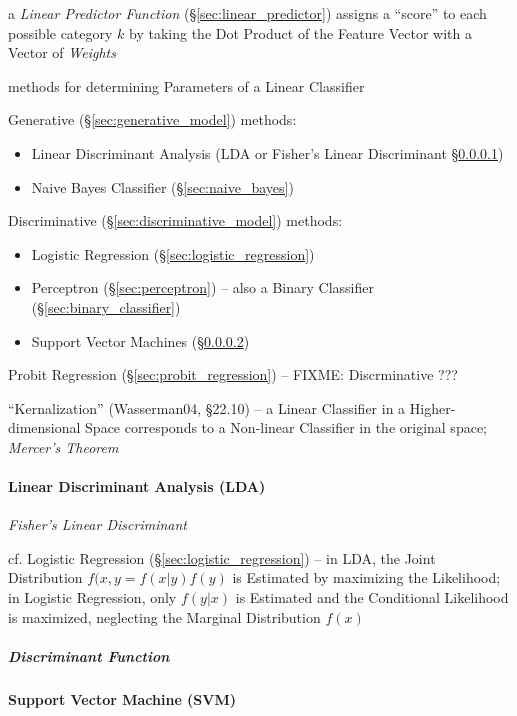 a \emph{Linear Predictor Function} (\S\ref{sec:linear_predictor}) assigns a
``score'' to each possible category $k$ by taking the Dot Product of the Feature
Vector with a Vector of \emph{Weights}

methods for determining Parameters of a Linear Classifier

Generative (\S\ref{sec:generative_model}) methods:
\begin{itemize}
  \item Linear Discriminant Analysis (LDA or Fisher's Linear Discriminant
    \S\ref{sec:lda})
  \item Naive Bayes Classifier (\S\ref{sec:naive_bayes})
\end{itemize}

Discriminative (\S\ref{sec:discriminative_model}) methods:
\begin{itemize}
  \item Logistic Regression (\S\ref{sec:logistic_regression})
  \item Perceptron (\S\ref{sec:perceptron}) -- also a Binary Classifier
    (\S\ref{sec:binary_classifier})
  \item Support Vector Machines (\S\ref{sec:svm})
\end{itemize}

Probit Regression (\S\ref{sec:probit_regression}) -- FIXME: Discrminative ???

``Kernalization'' (Wasserman04, \S22.10) -- a Linear Classifier in a
Higher-dimensional Space corresponds to a Non-linear Classifier in the original
space; \emph{Mercer's Theorem}



\paragraph{Linear Discriminant Analysis (LDA)}\label{sec:lda}\hfill

\emph{Fisher's Linear Discriminant}

cf. Logistic Regression (\S\ref{sec:logistic_regression}) -- in LDA, the Joint
Distribution $f(x,y = f(x|y)f(y)$ is Estimated by maximizing the Likelihood; in
Logistic Regression, only $f(y|x)$ is Estimated and the Conditional Likelihood
is maximized, neglecting the Marginal Distribution $f(x)$



\subparagraph{Discriminant Function}\label{sec:discriminant_function}\hfill



\paragraph{Support Vector Machine (SVM)}\label{sec:svm}\hfill

